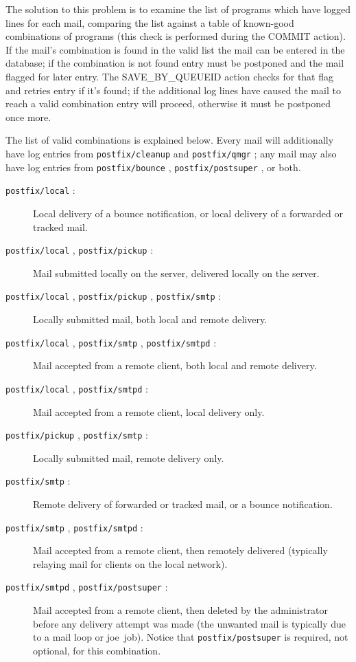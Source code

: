 \documentclass[a4paper,12pt,draft]{article}
\newcommand{\daemon}[1]{%
    \texttt{postfix/#1}%
}
\begin{document}
The solution to this problem is to examine the list of programs which have
logged lines for each mail, comparing the list against a table of
known-good combinations of programs (this check is performed during the
COMMIT action).  If the mail's combination is found in the valid list the
mail can be entered in the database; if the combination is not found entry
must be postponed and the mail flagged for later entry.  The
SAVE\_BY\_QUEUEID action checks for that flag and retries entry if it's
found; if the additional log lines have caused the mail to reach a valid
combination entry will proceed, otherwise it must be postponed once more.

The list of valid combinations is explained below.  Every mail will
additionally have log entries from \daemon{cleanup} and \daemon{qmgr}; any
mail may also have log entries from \daemon{bounce}, \daemon{postsuper}, or
both.

\begin{description}

    \item [\daemon{local}:] Local delivery of a bounce notification, or
        local delivery of a forwarded or tracked mail.

    \item [\daemon{local}, \daemon{pickup}:] Mail submitted locally on the
        server, delivered locally on the server.

    \item [\daemon{local}, \daemon{pickup}, \daemon{smtp}:] Locally
        submitted mail, \newline both local and remote delivery.

    \item [\daemon{local}, \daemon{smtp}, \daemon{smtpd}:] Mail accepted
        from a remote client, both local and remote delivery.

    \item [\daemon{local}, \daemon{smtpd}:] Mail accepted from a remote
        client, local delivery only.

    \item [\daemon{pickup}, \daemon{smtp}:] Locally submitted mail, remote
        delivery only.

    \item [\daemon{smtp}:] Remote delivery of forwarded or tracked mail, or
        a bounce notification.

    \item [\daemon{smtp}, \daemon{smtpd}:] Mail accepted from a remote
        client, then remotely delivered (typically relaying mail for
        clients on the local network).

    \item [\daemon{smtpd}, \daemon{postsuper}:] Mail accepted from a remote
        client, then deleted by the administrator before any delivery
        attempt was made (the unwanted mail is typically due to a mail loop
        or joe~job).  Notice that \daemon{postsuper} is required, not
        optional, for this combination.

\end{description}
\end{document}
